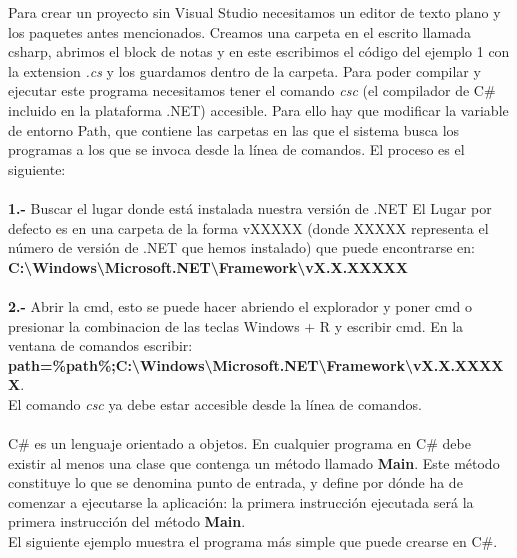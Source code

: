 \documentclass[12pt,a4paper]{report}
\begin{document}
Para crear un proyecto sin Visual Studio necesitamos un editor de texto plano y los paquetes antes mencionados. Creamos una carpeta en el escrito llamada csharp, abrimos el block de notas y en este escribimos el código del ejemplo 1 con la extension \textit{.cs} y los guardamos dentro de la carpeta. Para poder compilar y ejecutar este programa necesitamos tener el comando \textit{csc} (el compilador de C\# incluido en la plataforma .NET) accesible. Para ello hay que modificar la variable de entorno Path, que contiene las carpetas en las que el sistema busca los programas a los que se invoca desde la línea de comandos. El proceso es el siguiente:\\\\\textbf{1.-} Buscar el lugar donde está instalada nuestra versión de .NET El Lugar por defecto es en una carpeta de la forma vXXXXX (donde XXXXX representa el número de versión de .NET que hemos instalado) que puede encontrarse en:\\\textbf{C:\textbackslash Windows\textbackslash Microsoft.NET\textbackslash Framework\textbackslash vX.X.XXXXX}\\\\\textbf{2.-} Abrir la cmd, esto se puede hacer abriendo el explorador y poner cmd o presionar la combinacion de las teclas Windows + R y escribir cmd. En la ventana de comandos escribir:\\\textbf{path=\%path\%;C:\textbackslash Windows\textbackslash Microsoft.NET\textbackslash Framework\textbackslash vX.X.XXXXX}.\\El comando \textit{csc} ya debe estar accesible desde la línea de comandos.\\\\C\# es un lenguaje orientado a objetos. En cualquier programa en C\# debe existir al menos una clase que contenga un método llamado \textbf{Main}. Este método constituye lo que se denomina punto de entrada, y define por dónde ha de comenzar a ejecutarse la aplicación: la primera instrucción ejecutada será la primera instrucción del método \textbf{Main}.\\El siguiente ejemplo muestra el programa más simple que puede crearse en C\#.\\\\
\end{document}
